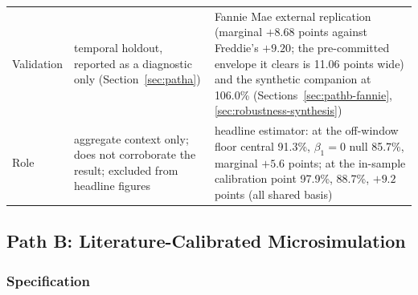 \documentclass[12pt]{article}
\begin{document}
\begin{table}[H]
\begin{threeparttable}
\begin{tabular}{@{}p{2.2cm}p{5.9cm}p{5.9cm}@{}}
Validation & temporal holdout, reported as a diagnostic only (Section~\ref{sec:patha}) & Fannie Mae external replication (marginal $+8.68$ points against Freddie's $+9.20$; the pre-committed envelope it clears is 11.06 points wide) and the synthetic companion at 106.0\% (Sections~\ref{sec:pathb-fannie}, \ref{sec:robustness-synthesis}) \\
Role & aggregate context only; does not corroborate the result; excluded from headline figures & headline estimator: at the off-window floor central 91.3\%, $\beta_1 = 0$ null 85.7\%, marginal $+5.6$ points; at the in-sample calibration point 97.9\%, 88.7\%, $+9.2$ points (all shared basis) \\
\bottomrule
\end{tabular}
\end{threeparttable}
\end{table}

\subsection{Path B: Literature-Calibrated Microsimulation}\label{sec:pathb}

\subsubsection{Specification}
\end{document}
